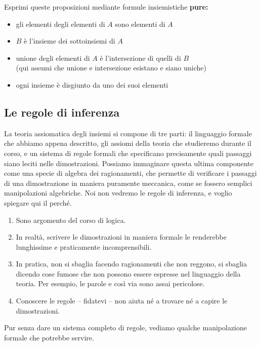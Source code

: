 \begin{exercise}
Esprimi queste proposizioni mediante formule insiemistiche \textbf{pure:}
\begin{itemize}
	\item gli elementi degli elementi di $A$ sono elementi di $A$
	\item $B$ \`e l'insieme dei sottoinsiemi di $A$
	\item unione degli elementi di $A$ \`e l'intersezione di quelli di $B$\\
{\drkgrn (qui assumi che unione e intersezione esistano e siano uniche)}
	\item ogni insieme \`e disgiunto da uno dei suoi elementi
\end{itemize}
\end{exercise}

\subsection{Le regole di inferenza}
La teoria assiomatica degli insiemi si compone di tre parti: il linguaggio formale che abbiamo appena descritto, gli assiomi della teoria che studieremo durante il corso, 
e un sistema di regole formali che specificano precisamente quali passaggi siano leciti nelle dimostrazioni. Possiamo immaginare questa ultima componente come una specie di algebra dei ragionamenti,
che permette di verificare i passaggi di una dimostrazione in maniera puramente meccanica, come se fossero semplici manipolazioni algebriche. Noi non vedremo le regole di inferenza, e voglio spiegare qui il perch\'e.
\begin{enumerate}[1]
	\item Sono argomento del corso di logica.
	\item In realt\`a, scrivere le dimostrazioni in maniera formale le renderebbe lunghissime e praticamente incomprensibili.
	\item In pratica, non si sbaglia facendo ragionamenti che non
reggono, si sbaglia dicendo cose fumose che non possono essere espresse
nel linguaggio della teoria. Per esempio, le parole {\drkred e cos\`i via}
sono assai pericolose.
	\item Conoscere le regole -- fidatevi -- non aiuta n\'e a trovare n\'e a capire le dimostrazioni.
\end{enumerate}
Pur senza dare un sistema completo di regole, vediamo qualche manipolazione formale che potrebbe servire.

